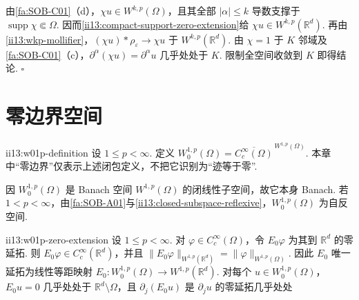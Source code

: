 \begin{FAProof}
由\autoref{fa:SOB-C01}（d），\(\displaystyle\chi u\in W^{k,p}(\Omega)\)，且其全部 \(\displaystyle|\alpha|\leqslant k\) 导数支撑于 \(\displaystyle\operatorname{supp}\chi\Subset\Omega\). 因而\autoref{ii13:compact-support-zero-extension}给 \(\displaystyle\chi u\in W^{k,p}(\mathbb R^d)\). 再由\autoref{ii13:wkp-mollifier}，\(\displaystyle(\chi u)*\rho_\varepsilon\to\chi u\) 于 \(\displaystyle W^{k,p}(\mathbb R^d)\). 由 \(\displaystyle\chi=1\) 于 \(\displaystyle K\) 邻域及\autoref{fa:SOB-C01}（c），\(\displaystyle\partial^\alpha(\chi u)=\partial^\alpha u\) 几乎处处于 \(\displaystyle K\). 限制全空间收敛到 \(\displaystyle K\) 即得结论.
\hfill\(\square\)
\end{FAProof}

\section{零边界空间}\label{sec:ii13-zero-boundary}

\begin{FADefinition}{ii13:w01p-definition}
设 \(\displaystyle1\leqslant p<\infty\). 定义 \(\displaystyle W_0^{1,p}(\Omega)=\overline{C_c^\infty(\Omega)}^{\,W^{1,p}(\Omega)}\). 本章中“零边界”仅表示上述闭包定义，不把它识别为“迹等于零”.
\end{FADefinition}

因 \(\displaystyle W_0^{1,p}(\Omega)\) 是 Banach 空间 \(\displaystyle W^{1,p}(\Omega)\) 的闭线性子空间，故它本身 Banach. 若 \(\displaystyle1<p<\infty\)，由\autoref{fa:SOB-A01}与\autoref{ii13:closed-subspace-reflexive}，\(\displaystyle W_0^{1,p}(\Omega)\) 为自反空间.

\begin{FAProposition}{ii13:w01p-zero-extension}
设 \(\displaystyle1\leqslant p<\infty\). 对 \(\displaystyle\varphi\in C_c^\infty(\Omega)\)，令 \(\displaystyle E_0\varphi\) 为其到 \(\displaystyle\mathbb R^d\) 的零延拓. 则 \(\displaystyle E_0\varphi\in C_c^\infty(\mathbb R^d)\)，并且 \(\displaystyle \|E_0\varphi\|_{W^{1,p}(\mathbb R^d)} = \|\varphi\|_{W^{1,p}(\Omega)}.\)
因此 \(\displaystyle E_0\) 唯一延拓为线性等距映射 \(\displaystyle E_0:W_0^{1,p}(\Omega) \longrightarrow W^{1,p}(\mathbb R^d).\)
对每个 \(\displaystyle u\in W_0^{1,p}(\Omega)\)，\(\displaystyle E_0u=0\) 几乎处处于 \(\displaystyle\mathbb R^d\setminus\Omega\)，且 \(\displaystyle\partial_j(E_0u)\) 是 \(\displaystyle\partial_ju\) 的零延拓几乎处处
\end{FAProposition}

